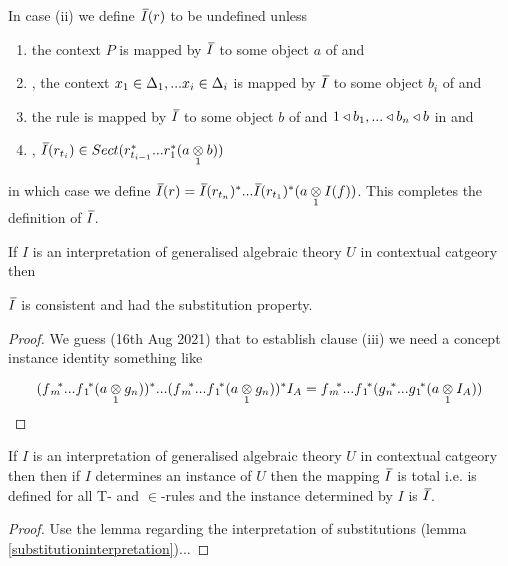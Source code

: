 \begin{definition}
\begin{enumerate}[(i)]
In  case (ii) 
we define $\Ibar(r)$ to be undefined unless
\begin{enumerate}
\item
the context  $P$ is mapped by $\Ibar$ to some object $a$ of \catcw and 
\item
\foreachi, the context $x_1 \in \Delta_1,... x_{i} \in \Delta_{i}$ is mapped by $\Ibar$ to some object $b_i$ of \catcw
and 
\item the rule  is mapped by $\Ibar$ to some object $b$ of \catcw and
$1 \triangleleft b_1,...\triangleleft b_n \triangleleft b$ in \catcw 
and 
\item
\foreachi, $\Ibar(r_{t_i}) \in Sect(r_{t_{i-1}}^*...r_1^* (\crossx{a}{b}{1}))$
\end{enumerate}
in which case we
define $\Ibar(r)=\Ibar(r_{t_n})^*...\Ibar(r_{t_1})^*(\crossx{a}{I(f)}{1})$.
This completes the definition of $\Ibar$.
\end{enumerate}
\end{definition}

\begin{lemma}
If $I$ is an interpretation of generalised algebraic theory $U$ in contextual catgeory \catcw
then
\begin{newtt}
$\Ibar$ is consistent and had the substitution property.
\end{newtt}
\end{lemma}
\begin{proof}

We guess (16th Aug 2021) that to establish clause (iii) we need a concept instance identity something like

\newcommand{\fmvectorstar}{\fmstar...\fonestar}
\newcommand{\gnvectorstar}{\gnstar...\gonestar}
\begin{equation*}
(\fmvectorstar (\crossx{a}{g_n}{1}))^* ... (\fmvectorstar (\crossx{a}{g_n}{1})) ^* I_A=\fmvectorstar(\gnvectorstar(\crossx{a}{I_A}{1}))
\end{equation*}
\end{proof}

\begin{lemma} 
If $I$ is an interpretation of generalised algebraic theory $U$ in contextual catgeory \catcw then then if $I$ determines an instance of $U$ then the
mapping $\Ibar$  is total i.e. is defined for all T- and $\in$-rules and the instance determined by $I$ is $\Ibar$.
\end{lemma}
\begin{proof}  
Use the lemma regarding the interpretation of substitutions (lemma \ref{substitutioninterpretation})...
\end{proof}

